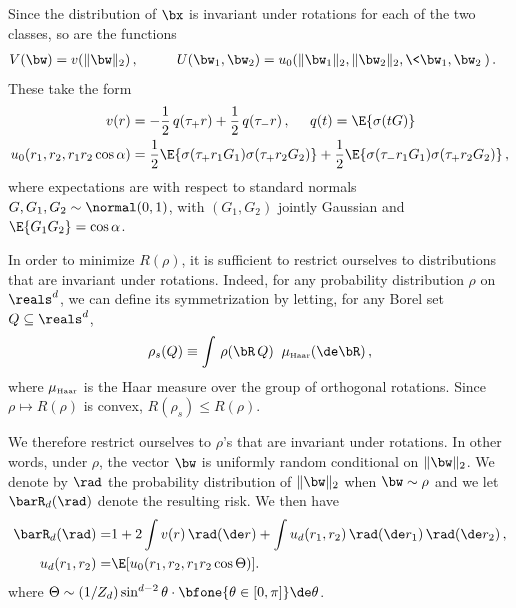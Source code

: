 \documentclass[11pt]{article}
\begin{document}
Since the distribution of $\bx$ is invariant under rotations for each of the two classes, so are the functions
%
\begin{align}
%
V(\bw) & =  v(\|\bw\|_2)\, ,\;\;\;\;\;\;\;\;\;\;
U(\bw_1, \bw_2)=  u_0(\|\bw_1\|_2,\|\bw_2\|_2,\<\bw_1,\bw_2\>)\,.
%
\end{align}
These take the form 
%
\begin{align}
%
v(r) & = -\frac{1}{2}\, q(\tau_+r)+\frac{1}{2}\, q(\tau_-r)\, ,\;\;\;\;\; q(t) =\E\{\sigma( t G)\} \\
u_0(r_1,r_2,r_1r_2\cos\alpha)& = \frac{1}{2}\E\{\sigma(\tau_+r_1G_1) \sigma(\tau_+r_2G_2)\}+\frac{1}{2}\E\{\sigma(\tau_-r_1G_1) \sigma(\tau_+r_2G_2)\}\, ,
%
\end{align}
%
where expectations are with respect to standard normals $G,G_1,G_2\sim\normal(0,1)$, with $(G_1, G_2)$ jointly Gaussian and $\E\{G_1 G_2\} = \cos\alpha$. 

In order to minimize $R(\rho)$, it is sufficient to restrict ourselves to distributions  that are invariant under
rotations.  Indeed, for any probability distribution $\rho$ on $\reals^d$, we can define its symmetrization by letting,
for any Borel set $Q\subseteq \reals^d$,
%
\begin{align}
%
\rho_s(Q) \equiv \int\, \rho(\bR \, Q) \;\;  \mu_{\mbox{\tiny\rm Haar}} (\de \bR)\, ,
%
\end{align}
%
where $\mu_{\mbox{\tiny\rm Haar}}$ is the Haar measure over the group of orthogonal rotations. Since $\rho\mapsto R(\rho)$ is 
convex, $R(\rho_s)\le R(\rho)$.

We therefore restrict ourselves to $\rho$'s that are invariant under rotations.
In other words, under $\rho$, the vector $\bw$ is uniformly random conditional on $\|\bw\|_2$. 
We denote by $\rad$ the probability distribution of $\|\bw\|_2$ when $\bw\sim\rho$ and we let $\barR_d(\rad)$ denote the resulting risk. We then have
%
\begin{align}
%
\barR_d(\rad) =& 1+2 \int v(r) \, \rad(\de r) + \int u_d(r_1,r_2) \, \rad(\de r_1)\,\rad(\de r_2)\, ,\\
u_d(r_1,r_2) =& \E[u_0(r_1,r_2,r_1r_2 \cos\Theta)] .\label{eqn:u_d_isotropic}
%
\end{align}
where $\Theta \sim (1/Z_d) \sin^{d - 2} \theta \cdot \bfone\{\theta \in [0, \pi] \} \de \theta$. 
\end{document}

